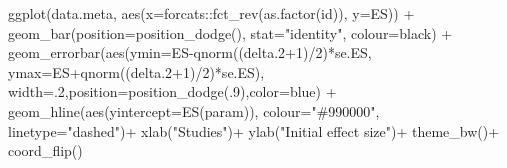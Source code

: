 \documentclass[
]{book}
\newenvironment{Shaded}{\begin{snugshade}}{\end{snugshade}}
\newcommand{\AttributeTok}[1]{\textcolor[rgb]{0.77,0.63,0.00}{#1}}
\newcommand{\DecValTok}[1]{\textcolor[rgb]{0.00,0.00,0.81}{#1}}
\newcommand{\FloatTok}[1]{\textcolor[rgb]{0.00,0.00,0.81}{#1}}
\newcommand{\FunctionTok}[1]{\textcolor[rgb]{0.00,0.00,0.00}{#1}}
\newcommand{\NormalTok}[1]{#1}
\newcommand{\SpecialCharTok}[1]{\textcolor[rgb]{0.00,0.00,0.00}{#1}}
\newcommand{\StringTok}[1]{\textcolor[rgb]{0.31,0.60,0.02}{#1}}
\theoremstyle{definition}
\theoremstyle{definition}
\theoremstyle{definition}
\theoremstyle{definition}
\theoremstyle{remark}
\begin{document}
\begin{Shaded}
\begin{Highlighting}[]
  \FunctionTok{ggplot}\NormalTok{(data.meta, }\FunctionTok{aes}\NormalTok{(}\AttributeTok{x=}\NormalTok{forcats}\SpecialCharTok{::}\FunctionTok{fct\_rev}\NormalTok{(}\FunctionTok{as.factor}\NormalTok{(id)), }\AttributeTok{y=}\NormalTok{ES)) }\SpecialCharTok{+}
      \FunctionTok{geom\_bar}\NormalTok{(}\AttributeTok{position=}\FunctionTok{position\_dodge}\NormalTok{(), }\AttributeTok{stat=}\StringTok{"identity"}\NormalTok{, }\AttributeTok{colour=}\StringTok{\textquotesingle{}black\textquotesingle{}}\NormalTok{) }\SpecialCharTok{+}
      \FunctionTok{geom\_errorbar}\NormalTok{(}\FunctionTok{aes}\NormalTok{(}\AttributeTok{ymin=}\NormalTok{ES}\SpecialCharTok{{-}}\FunctionTok{qnorm}\NormalTok{((delta}\FloatTok{.2}\SpecialCharTok{+}\DecValTok{1}\NormalTok{)}\SpecialCharTok{/}\DecValTok{2}\NormalTok{)}\SpecialCharTok{*}\NormalTok{se.ES, }\AttributeTok{ymax=}\NormalTok{ES}\SpecialCharTok{+}\FunctionTok{qnorm}\NormalTok{((delta}\FloatTok{.2}\SpecialCharTok{+}\DecValTok{1}\NormalTok{)}\SpecialCharTok{/}\DecValTok{2}\NormalTok{)}\SpecialCharTok{*}\NormalTok{se.ES), }\AttributeTok{width=}\NormalTok{.}\DecValTok{2}\NormalTok{,}\AttributeTok{position=}\FunctionTok{position\_dodge}\NormalTok{(.}\DecValTok{9}\NormalTok{),}\AttributeTok{color=}\StringTok{\textquotesingle{}blue\textquotesingle{}}\NormalTok{) }\SpecialCharTok{+}
      \FunctionTok{geom\_hline}\NormalTok{(}\FunctionTok{aes}\NormalTok{(}\AttributeTok{yintercept=}\FunctionTok{ES}\NormalTok{(param)), }\AttributeTok{colour=}\StringTok{"\#990000"}\NormalTok{, }\AttributeTok{linetype=}\StringTok{"dashed"}\NormalTok{)}\SpecialCharTok{+}
      \FunctionTok{xlab}\NormalTok{(}\StringTok{"Studies"}\NormalTok{)}\SpecialCharTok{+}
      \FunctionTok{ylab}\NormalTok{(}\StringTok{"Initial effect size"}\NormalTok{)}\SpecialCharTok{+}
      \FunctionTok{theme\_bw}\NormalTok{()}\SpecialCharTok{+}
      \FunctionTok{coord\_flip}\NormalTok{()}


\end{Highlighting}
\end{Shaded}
\end{document}
